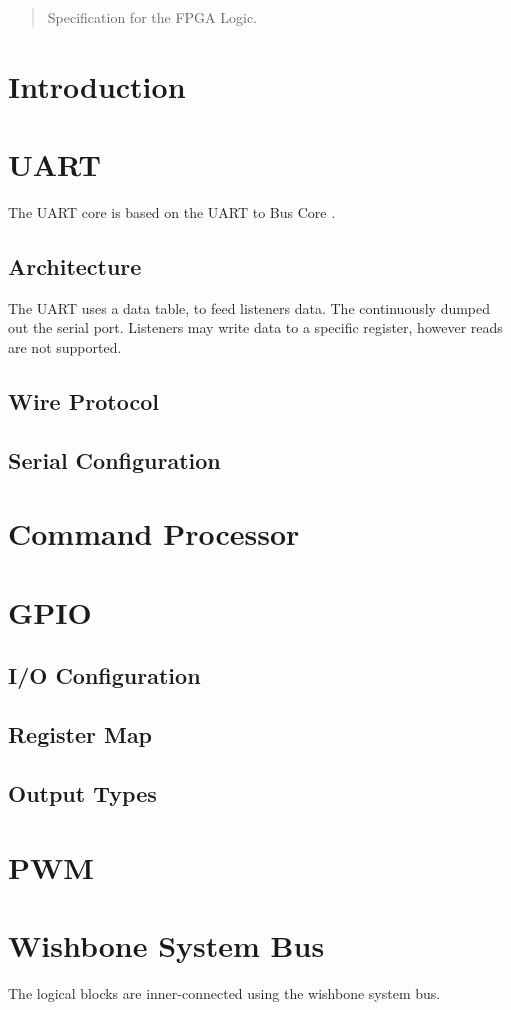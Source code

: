 \documentclass[12pt]{article}
\begin{document}
\maketitle

\begin{abstract}
Specification for the FPGA Logic.
\end{abstract}
\clearpage
\section{Introduction}
\section{UART}\label{uart}
The UART core is based on the UART to Bus Core \cite{U2B:01}.
\subsection{Architecture}

The UART uses a data table, to feed listeners data. The continuously dumped
out the serial port. Listeners may write data to a specific register, however
reads are not supported. 
\subsection{Wire Protocol}
\subsection{Serial Configuration}

\section{Command Processor}\label{cmdProcessor}

\section{GPIO}\label{gpio}
\subsection{I/O Configuration}
\subsection{Register Map}
\subsection{Output Types}


\section{PWM}


\section{Wishbone System Bus}
The logical blocks are inner-connected using the wishbone system bus\cite{OpenCores:01}.



\end{document}
